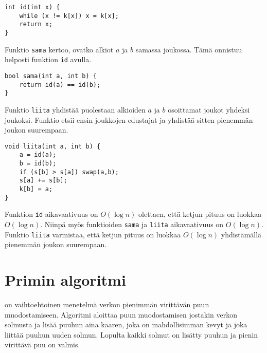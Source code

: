\begin{lstlisting}
int id(int x) {
    while (x != k[x]) x = k[x];
    return x;
}
\end{lstlisting}

Funktio \texttt{sama} kertoo,
ovatko alkiot $a$ ja $b$ samassa joukossa.
Tämä onnistuu helposti funktion
\texttt{id} avulla.

\begin{lstlisting}
bool sama(int a, int b) {
    return id(a) == id(b);
}
\end{lstlisting}

\begin{samepage}
Funktio \texttt{liita} yhdistää
puolestaan alkioiden $a$ ja $b$ osoittamat
joukot yhdeksi joukoksi.
Funktio etsii ensin joukkojen edustajat
ja yhdistää sitten pienemmän joukon suurempaan.

\begin{lstlisting}
void liita(int a, int b) {
    a = id(a);
    b = id(b);
    if (s[b] > s[a]) swap(a,b);
    s[a] += s[b];
    k[b] = a;
}
\end{lstlisting}
\end{samepage}

Funktion \texttt{id} aikavaativuus on $O(\log n)$
olettaen, että ketjun pituus on luokkaa $O(\log n)$.
Niinpä myös funktioiden \texttt{sama} ja \texttt{liita}
aikavaativuus on $O(\log n)$.
Funktio \texttt{liita} varmistaa,
että ketjun pituus on luokkaa $O(\log n)$
yhdistämällä pienemmän joukon suurempaan.

% 
% 

\section{Primin algoritmi}


 on vaihtoehtoinen menetelmä
verkon pienimmän virittävän puun muodostamiseen.
Algoritmi aloittaa puun muodostamisen jostakin
verkon solmusta ja lisää puuhun aina kaaren,
joka on mahdollisimman kevyt ja joka
liittää puuhun uuden solmun.
Lopulta kaikki solmut on lisätty puuhun
ja pienin virittävä puu on valmis.

